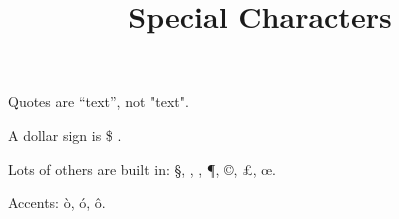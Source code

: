 \documentclass[onecolumn]{article}
\title{Special Characters}
\begin{document}
\maketitle

Quotes are ``text'', not "text".

A dollar sign is \$ .

Lots of others are built in: \S, \dag, \ddag, \P, \copyright, \pounds, \oe.

Accents: \`o, \'o, \^o.
\end{document}
